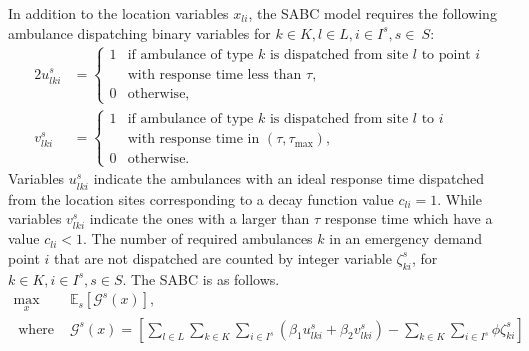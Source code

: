 In addition to the location variables $x_{li}$, the SABC model requires the following ambulance dispatching binary variables for $k\in K, l\in L, i\in I^s, s\in~S$: 
\begin{alignat}{2}
       u^s_{lki} & = \left\{
       \begin{array}{ll} 
        1 & \text{if ambulance of type $k$ is dispatched from site $l$ 
             to point $i$} \\
          &   \text{with response time less than $\tau$},\\
         0 & \text{otherwise},
       \end{array} \right.\nonumber\\
%
       v^s_{lki} & = \left\{
       \begin{array}{ll} 
        1 & \text{if ambulance of type $k$ is dispatched from site $l$ 
             to $i$ }\\
             &   \text{with response time in $(\tau,\tau_{\max})$},\\
         0 & \text{otherwise}.
       \end{array} \right.\nonumber
\end{alignat}
Variables $u^s_{lki}$ indicate the ambulances with an ideal response time dispatched from the location sites corresponding to a decay function value $c_{li}=1$. While variables $v^s_{lki}$ indicate the ones with a larger than $\tau$ response time which have a value $c_{li} < 1$. The number of required ambulances $k$ in an emergency demand point $i$ that are not dispatched are counted by integer variable $\zeta^s_{ki}$, for  $k\in K, i\in I^s, s \in S$. The SABC is as follows. 
\begin{align}
      \max_{x} \ \ & \mathbb{E}_s [ \mathcal{G}^s(x)],
    \label{eq18}\\
 \text{ where } &  \mathcal{G}^s(x) =  \left[ {\sum_{l \in L} \sum_{k \in K} \sum_{i \in I^s}} (\beta_1 u_{lki}^s + \beta_2 v_{lki}^s) - \sum_{k \in K} \sum_{i \in I^s}  \phi \zeta_{ki}^s \right]
    \label{obj19}
\end{align}
